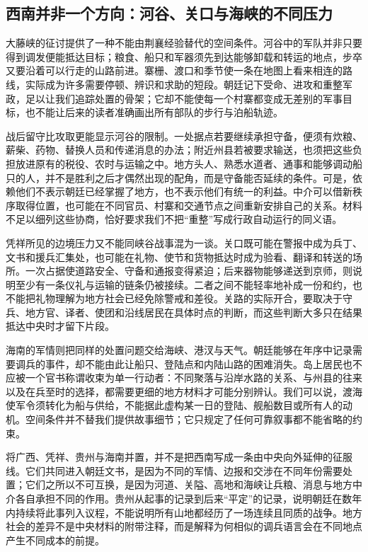\subsection{西南并非一个方向：河谷、关口与海峡的不同压力}

大藤峡的征讨提供了一种不能由荆襄经验替代的空间条件。河谷中的军队并非只要得到调发便能抵达目标；粮食、船只和军器须先到达能够卸载和转运的地点，步卒又要沿着可以行走的山路前进。寨栅、渡口和季节使一条在地图上看来相连的路线，实际成为许多需要停顿、辨识和求助的短段。朝廷记下受命、进攻和重整军政，足以让我们追踪处置的骨架；它却不能使每一个村寨都变成无差别的军事目标，也不能让后来的读者准确画出所有部队的步行与泊船轨迹。

战后留守比攻取更能显示河谷的限制。一处据点若要继续承担守备，便须有炊粮、薪柴、药物、替换人员和传递消息的办法；附近州县若被要求输送，也须把这些负担放进原有的税役、农时与运输之中。地方头人、熟悉水道者、通事和能够调动船只的人，并不是胜利之后才偶然出现的配角，而是守备能否延续的条件。可是，依赖他们不表示朝廷已经掌握了地方，也不表示他们有统一的利益。中介可以借新秩序取得位置，也可能在不同官员、村寨和交通节点之间重新安排自己的关系。材料不足以细列这些协商，恰好要求我们不把“重整”写成行政自动运行的同义语。

凭祥所见的边境压力又不能同峡谷战事混为一谈。关口既可能在警报中成为兵丁、文书和援兵汇集处，也可能在礼物、使节和货物抵达时成为验看、翻译和转送的场所。一次占据使道路安全、守备和通报变得紧迫；后来器物能够递送到京师，则说明至少有一条仪礼与运输的链条仍被接续。二者之间不能轻率地补成一份和约，也不能把礼物理解为地方社会已经免除警戒和差役。关路的实际开合，要取决于守兵、地方官、译者、使团和沿线居民在具体时点的判断，而这些判断大多只在结果抵达中央时才留下片段。

海南的军情则把同样的处置问题交给海峡、港汊与天气。朝廷能够在年序中记录需要调兵的事件，却不能由此让船只、登陆点和内陆山路的困难消失。岛上居民也不应被一个官书称谓收束为单一行动者：不同聚落与沿岸水路的关系、与州县的往来以及在兵至时的选择，都需要更细的地方材料才可能分别辨认。我们可以说，渡海使军令须转化为船与供给，不能据此虚构某一日的登陆、舰船数目或所有人的动机。空间条件并不替我们提供故事细节；它只规定了任何可靠叙事都不能省略的约束。

将广西、凭祥、贵州与海南并置，并不是把西南写成一条由中央向外延伸的征服线。它们共同进入朝廷文书，是因为不同的军情、边报和交涉在不同年份需要处置；它们之所以不可互换，是因为河道、关隘、高地和海峡让兵粮、消息与地方中介各自承担不同的作用。贵州从起事的记录到后来“平定”的记录，说明朝廷在数年内持续将此事列入议程，不能说明所有山地都经历了一场连续且同质的战争。地方社会的差异不是中央材料的附带注释，而是解释为何相似的调兵语言会在不同地点产生不同成本的前提。

